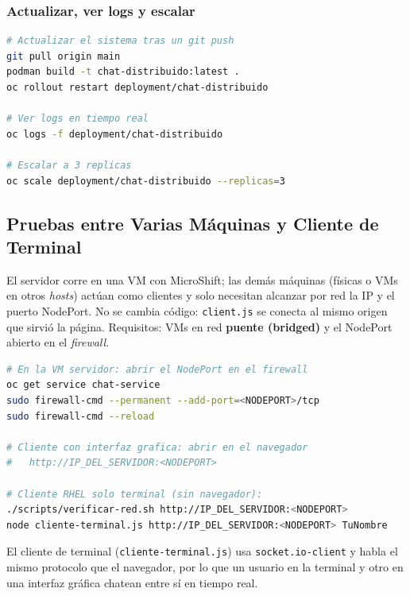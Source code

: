 \documentclass[11pt,a4paper]{article}
\begin{document}
\subsubsection*{Actualizar, ver logs y escalar}
\begin{lstlisting}[language=bash]
# Actualizar el sistema tras un git push
git pull origin main
podman build -t chat-distribuido:latest .
oc rollout restart deployment/chat-distribuido

# Ver logs en tiempo real
oc logs -f deployment/chat-distribuido

# Escalar a 3 replicas
oc scale deployment/chat-distribuido --replicas=3
\end{lstlisting}

\subsection{Pruebas entre Varias Máquinas y Cliente de Terminal}
El servidor corre en una VM con MicroShift; las demás máquinas (físicas o VMs en
otros \emph{hosts}) actúan como clientes y solo necesitan alcanzar por red la IP
y el puerto NodePort. No se cambia código: \texttt{client.js} se conecta al mismo
origen que sirvió la página. Requisitos: VMs en red \textbf{puente (bridged)} y
el NodePort abierto en el \emph{firewall}.

\begin{lstlisting}[language=bash]
# En la VM servidor: abrir el NodePort en el firewall
oc get service chat-service
sudo firewall-cmd --permanent --add-port=<NODEPORT>/tcp
sudo firewall-cmd --reload

# Cliente con interfaz grafica: abrir en el navegador
#   http://IP_DEL_SERVIDOR:<NODEPORT>

# Cliente RHEL solo terminal (sin navegador):
./scripts/verificar-red.sh http://IP_DEL_SERVIDOR:<NODEPORT>
node cliente-terminal.js http://IP_DEL_SERVIDOR:<NODEPORT> TuNombre
\end{lstlisting}

El cliente de terminal (\texttt{cliente-terminal.js}) usa \texttt{socket.io-client}
y habla el mismo protocolo que el navegador, por lo que un usuario en la terminal
y otro en una interfaz gráfica chatean entre sí en tiempo real.
\end{document}

